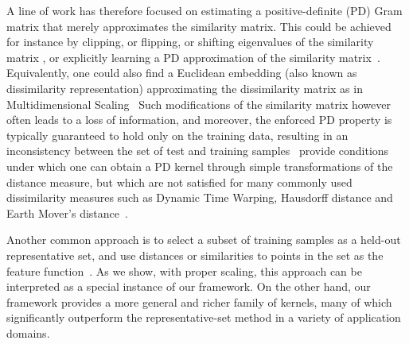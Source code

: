 \documentclass{article}
\newcommand{\1}{\mathbf{1}}
\begin{document}
A line of work has therefore focused on estimating a positive-definite (PD) Gram matrix that merely approximates the similarity matrix. This could be achieved for instance by clipping, or flipping, or shifting eigenvalues of the similarity matrix \cite{pekalska2001generalized}, or explicitly learning a PD approximation of the similarity matrix~\cite{chen2008training,chen2009learning}. Equivalently, one could also find a Euclidean embedding (also known as  dissimilarity representation) approximating the dissimilarity matrix as in Multidimensional Scaling~\cite{pekalska2001generalized,pkkalska2005dissimilarity,pekalska2006dissimilarity,pekalska2008beyond,duin2012dissimilarity}
Such modifications of the similarity matrix however often leads to a loss of information, and moreover, the enforced PD property is typically guaranteed to hold only on the training data, resulting in an inconsistency between the set of test and training samples~\cite{chen2009similarity} 
\cite{haasdonk2004learning,scholkopf2001kernel} provide conditions under which one can obtain a PD kernel through simple transformations of the distance measure, but which are not satisfied for many commonly used dissimilarity measures such as Dynamic Time Warping, Hausdorff distance and Earth Mover's distance~\cite{haasdonk2004learning}.

Another common approach is to select a subset of training samples as a held-out representative set, and use distances or similarities to points in the set as the feature function~\cite{graepel1999classification,pekalska2001generalized}. As we show, with proper scaling, this approach can be interpreted as a special instance of our framework. On the other hand, our framework provides a more general and richer family of kernels, many of which significantly outperform the representative-set method in a variety of application domains.
\end{document}
